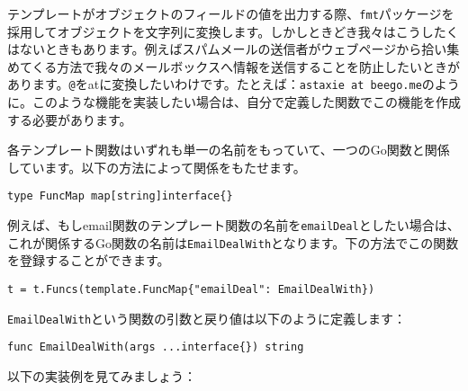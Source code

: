 テンプレートがオブジェクトのフィールドの値を出力する際、\texttt{fmt}パッケージを採用してオブジェクトを文字列に変換します。しかしときどき我々はこうしたくはないときもあります。例えばスパムメールの送信者がウェブページから拾い集めてくる方法で我々のメールボックスへ情報を送信することを防止したいときがあります。\texttt{@}をatに変換したいわけです。たとえば：\texttt{astaxie at beego.me}のように。このような機能を実装したい場合は、自分で定義した関数でこの機能を作成する必要があります。

各テンプレート関数はいずれも単一の名前をもっていて、一つのGo関数と関係しています。以下の方法によって関係をもたせます。


\begin{lstlisting}[numbers=none]
type FuncMap map[string]interface{}
\end{lstlisting}

例えば、もしemail関数のテンプレート関数の名前を\texttt{emailDeal}としたい場合は、これが関係するGo関数の名前は\texttt{EmailDealWith}となります。下の方法でこの関数を登録することができます。

\begin{lstlisting}[numbers=none]
t = t.Funcs(template.FuncMap{"emailDeal": EmailDealWith})
\end{lstlisting}

\texttt{EmailDealWith}という関数の引数と戻り値は以下のように定義します：

\begin{lstlisting}[numbers=none]
func EmailDealWith(args ...interface{}) string
\end{lstlisting}

以下の実装例を見てみましょう：


